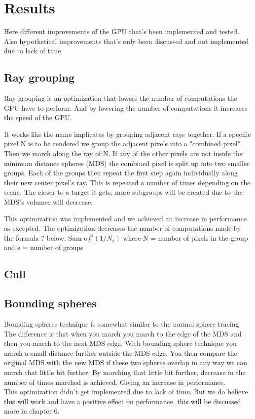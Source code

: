 \chapter{Results}

	Here different improvements of the GPU that's been implemented and tested.
	Also hypothetical improvements that's only been discussed and not
	implemented due to lack of time.  

	\section{Ray grouping}
	
		Ray grouping is an optimization that lowers the number of computations
		the GPU have to perform. And by lowering the number of computations it
		increases the speed of the GPU.
		
		It works like the name implicates by grouping adjacent rays together.
		If a specific pixel N is to be rendered we group the adjacent pixels
		into a "combined pixel". Then we march along the ray of N. If any of
		the other pixels are not inside the minimum distance spheres (MDS) the
		combined pixel is split up into two smaller groups. Each of the groups
		then repeat the first step again individually along their new center
		pixel's ray. This is repeated a number of times depending on the scene.
		The closer to a target it gets, more subgroups will be created due to
		the MDS's volumes will decrease.
		
		This optimization was implemented and we achieved an increase in
		performance as excepted. The optimization decreases the number of
		computations made by the formula ? below.  Sum o$f_1^s(1/N_s)$ where N
		= number of pixels in the group and s = number of groups
	
	
	\section{Cull}
	
	\section{Bounding spheres}

		Bounding spheres technique is somewhat similar to the normal sphere
		tracing. The difference is that when you march you march to the edge of
		the MDS and then you march to the next MDS edge. With bounding sphere
		technique you march a small distance further outside the MDS edge. You
		then compare the original MDS with the new MDS if these two spheres
		overlap in any way we can march that little bit further. By marching
		that little bit further, decrease in the number of times marched is
		achieved. Giving an increase in performance.  \\ This optimization
		didn't get implemented due to lack of time. But we do believe this will
		work and have a positive effect on performance. this will be discussed
		more in chapter 6.
	
